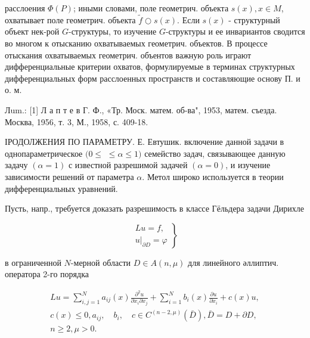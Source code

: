\documentclass[10pt]{article}
\begin{document}
расслоения $\Phi(P)$; иными словами, поле геометрич. объекта $s(x), x \in M$, охватывает поле геометрич. объекта $\tilde{f} \bigcirc s(x)$. Если $s(x)$ - структурный объект нек-рой $G$-структуры, то изучение $G$-структуры и ее инвариантов сводится во многом к отысканию охватываемых геометрич. объектов. В процессе отыскания охватываемых геометрич. объентов важную роль играют дифференциальные критерии охватов, формулируемые в терминах структурных дифференциальных форм расслоенных пространств и составляющие основу П. и о. м.



Лum.: [1] Л а п т е в Г. Ф., «Тр. Моск. матем. об-ва", 1953, матем. съезда. Москва, 1956, т. 3, М., 1958, с. 409-18.



ІРОДОЛЖЕНИЯ ПО ПАРАМЕТРУ. Е. Евтушик. включение данной задачи в однопараметрическое $(0 \leqslant$ $\leqslant \alpha \leqslant 1)$ семейство задач, связывающее данную задачу $(\alpha=1)$ с известной разрешимой задачей $(\alpha=0)$, и изучение зависимости решений от параметра $\alpha$. Метол широко используется в теории дифференциальных уравнений.



Пусть, напр., требуется доказать разрешимость в классе Гёльдера задачи Дирихле



\[

\left.\begin{array}{r}

L u=f, \\

\left.u\right|_{\partial D}=\varphi

\end{array}\right\}

\]



в ограниченной $N$-мерной области $D \in A(n, \mu)$ для линейного әллиптич. оператора 2-го порядка



\[

\begin{gathered}

L u=\sum_{i, j=1}^{N} a_{i j}(x) \frac{\partial^{2} u}{\partial x_{i} \partial x_{j}}+\sum_{i=1}^{N} b_{i}(x) \frac{\partial u}{\partial x_{i}}+c(x) u, \\

c(x) \leqslant 0, a_{i j}, \quad b_{i}, \quad c \in C^{(n-2, \mu)}(\bar{D}), \bar{D}=D+\partial D, \\

n \geqslant 2, \mu>0 .

\end{gathered}

\]
\end{document}
